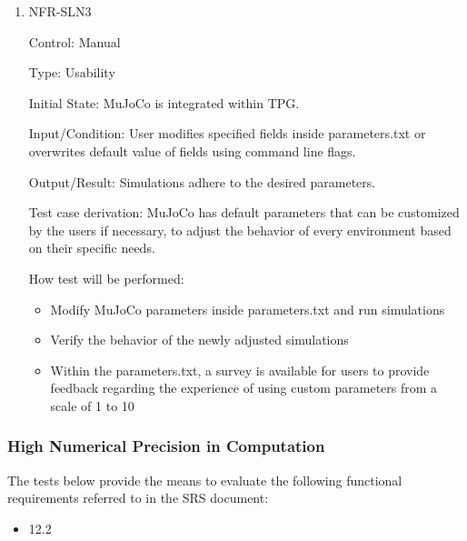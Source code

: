 \documentclass[12pt, titlepage]{article}
\begin{document}
\begin{enumerate}
\item NFR-SLN3

Control: Manual

Type: Usability

Initial State: MuJoCo is integrated within TPG.

Input/Condition: User modifies specified fields inside parameters.txt or overwrites default value of fields using command line flags.

Output/Result: Simulations adhere to the desired parameters.

Test case derivation: MuJoCo has default parameters that can be customized by the users if necessary, to adjust the behavior of every environment based on their specific needs.

How test will be performed:
\begin{itemize}
  \item Modify MuJoCo parameters inside parameters.txt and run simulations
  \item Verify the behavior of the newly adjusted simulations
  \item Within the parameters.txt, a survey is available for users to provide feedback regarding the experience of using custom parameters from a scale of 1 to 10
\end{itemize}

\end{enumerate}

\subsubsection{High Numerical Precision in Computation}

The tests below provide the means to evaluate the following functional requirements referred to in the SRS document:
\begin{itemize}
  \item 12.2
\end{itemize}
\end{document}
